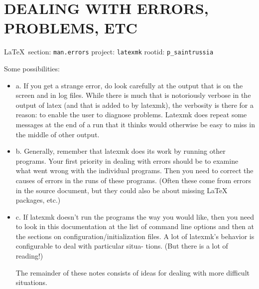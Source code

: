  
 
\section{DEALING WITH ERRORS, PROBLEMS, ETC}
  
\vspace{0.5cm}
 {\ifDEBUG\small\LaTeX~section: \verb|man.errors| project: \verb|latexmk| rootid: \verb|p_saintrussia| \fi}
\vspace{0.5cm}
  
Some possibilities:

\begin{itemize}
  \item a. If you get a strange error, do look carefully at the output that  is
          on  the  screen  and  in  log  files.   While  there  is  much  that
                is notoriously verbose in the output of latex (and that is
                added to by latexmk),  the verbosity is there for a reason:
                to enable the user to diagnose problems.  Latexmk does repeat
                some messages at the end of a run that  it  thinks would
                otherwise be easy to miss in the middle of other output.

  \item b. Generally, remember that latexmk does its work by running other
          programs.  Your first priority in dealing with errors should be to
                examine what went wrong with the individual programs.  Then you
                need to correct the  causes of errors in the runs of these
                programs.  (Often these come from errors in the source
                document, but they could also be about  missing LaTeX
                packages, etc.)

  \item c. If latexmk doesn't run the programs the way you would like, then you
          need to look in this documentation at the list of command line
                options and  then at the sections on
                configuration/initialization files.  A lot of latexmk's
                behavior is configurable to deal  with  particular  situa-
                tions.  (But there is a lot of reading!)

The  remainder  of  these notes consists of ideas for dealing with more
difficult situations.


\end{itemize}
